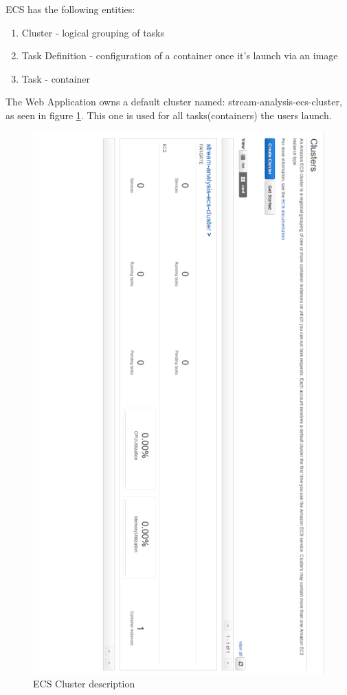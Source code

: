 ECS has the following entities:

\begin{enumerate}
	\item Cluster - logical grouping of tasks 
	\item Task Definition - configuration of a container once it's launch via an image
	\item Task - container
\end{enumerate}

The Web Application owns a default cluster named: stream-analysis-ecs-cluster, as seen in figure \ref{fig:ecs-cluster}. This one is used for all tasks(containers) the users launch.

\begin{figure}[p]
	\centering
	\noindent
	\includegraphics[width=0.5\paperwidth]{./images/aws_resources/ECSCluster.PNG}
	\caption{ECS Cluster description}
	\label{fig:ecs-cluster}
\end{figure}

